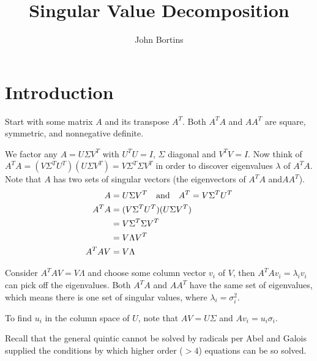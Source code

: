 \documentclass{article}
\title{Singular Value Decomposition}
\author{John Bortins}
\begin{document}
\maketitle{}

\section{Introduction}
Start with some matrix $A$ and its transpose $A^T$. Both $A^T A$ and $AA^T$ are square, symmetric, and  nonnegative definite.

We factor any $A=U\Sigma V^T$ with $U^T U=I$, $\Sigma$ diagonal and $V^T V=I$. Now think of $A^T A=(V\Sigma^T U^T)(U\Sigma V^T)=V\Sigma^T \Sigma V^T$ in  order to discover eigenvalues $\lambda$ of $A^T A$. Note that $A$ has two sets of singular vectors (the eigenvectors of $A^T A$ and$AA^T$).
\begin{align*}
    A      & =U\Sigma V^T\qand A^T=V\Sigma^T U^T \\
    A^T A  & =(V\Sigma^T U^T)(U\Sigma V^T)       \\
           & =V\Sigma^T \Sigma V^T               \\
           & =V\Lambda V^T                       \\
    A^T AV & =V\Lambda
\end{align*}

Consider $A^T AV=V\Lambda$ and choose some column vector $v_i$ of $V$, then $A^T Av_i=\lambda_i v_i$ can pick off the eigenvalues. Both $A^T A$ and $AA^T$ have the same set of eigenvalues, which means there is one set of singular values, where $\lambda_i=\sigma_i^2$.

To find $u_i$ in the column space of $U$, note that $AV=U\Sigma$ and $Av_i=u_i\sigma_i$.

Recall that the general quintic cannot be solved by radicals per Abel and Galois supplied the conditions by which higher order ($>4$) equations can be so solved.
\end{document}
